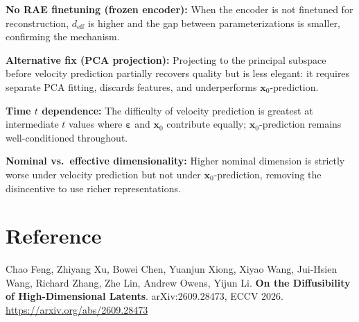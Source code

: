 \documentclass[10pt,twocolumn]{article}
\begin{document}
\textbf{No RAE finetuning (frozen encoder):} When the encoder is not
finetuned for reconstruction, $d_\text{eff}$ is higher and the gap between
parameterizations is smaller, confirming the mechanism.

\textbf{Alternative fix (PCA projection):} Projecting to the principal
subspace before velocity prediction partially recovers quality but is less
elegant: it requires separate PCA fitting, discards features, and underperforms
$\mathbf{x}_0$-prediction.

\textbf{Time $t$ dependence:} The difficulty of velocity prediction is
greatest at intermediate $t$ values where $\boldsymbol{\varepsilon}$ and
$\mathbf{x}_0$ contribute equally; $\mathbf{x}_0$-prediction remains
well-conditioned throughout.

\textbf{Nominal vs.\ effective dimensionality:} Higher nominal dimension is
strictly worse under velocity prediction but not under $\mathbf{x}_0$-prediction,
removing the disincentive to use richer representations.

\section*{Reference}

Chao Feng, Zhiyang Xu, Bowei Chen, Yuanjun Xiong, Xiyao Wang, Jui-Hsien Wang,
Richard Zhang, Zhe Lin, Andrew Owens, Yijun Li.
\textbf{On the Diffusibility of High-Dimensional Latents}.
arXiv:2609.28473, ECCV 2026.\\
\url{https://arxiv.org/abs/2609.28473}
\end{document}
